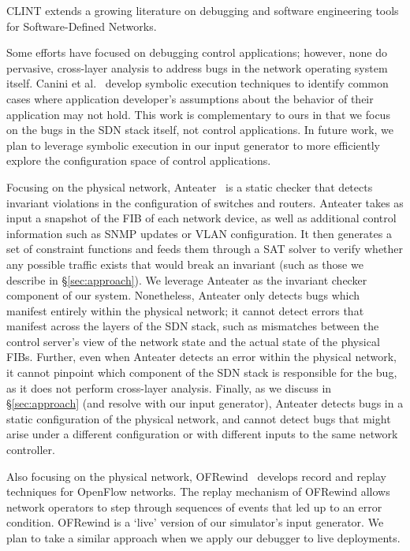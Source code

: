 CLINT extends a growing literature on debugging and software engineering tools for Software-Defined Networks.
    
Some efforts have focused on debugging control applications; however, none do pervasive,
cross-layer analysis to address bugs in the network operating system itself. 
Canini et al.~\cite{canini} develop symbolic execution techniques to identify
common cases where application developer's assumptions about the behavior of
their application may not hold. This work is complementary to ours in
that we focus on the bugs in the SDN stack itself, not control applications.
In future work, we plan to leverage symbolic execution in our
input generator to more efficiently explore the configuration space
of control applications.

Focusing on the physical network, Anteater~\cite{anteater} is a static checker that
detects invariant violations in the configuration of switches and routers.
Anteater takes as input a snapshot of the FIB of each network device, as well as
additional control information such as SNMP updates or VLAN configuration. It then
generates a set of constraint functions and feeds them through a SAT solver to verify whether
any possible traffic exists that would break an invariant (such as those we describe in \S\ref{sec:approach}).
 We leverage
Anteater as the invariant checker component of our system.
Nonetheless, Anteater only detects bugs which manifest entirely within the physical network;  
it cannot detect errors that manifest across the layers of the SDN stack, such as mismatches
between the control server's view of the network state and the actual state of the
physical FIBs. Further, even when Anteater detects an error within the physical network, it cannot pinpoint
which component of the SDN stack is responsible for the bug, as it does not perform cross-layer
analysis. Finally, as we discuss in \S\ref{sec:approach} (and resolve with our input generator), 
Anteater detects bugs in a static configuration
of the physical network, and cannot detect bugs that might arise under a different configuration or with different
inputs to the same network controller.

Also focusing on the physical network, OFRewind~\cite{ofrewind} develops record and replay techniques
for OpenFlow networks. The replay
mechanism of OFRewind allows network operators to step through sequences of
events that led up to an error condition. OFRewind is a `live' version of our
simulator's input generator. We plan to take a similar approach when we apply
our debugger to live deployments.  

